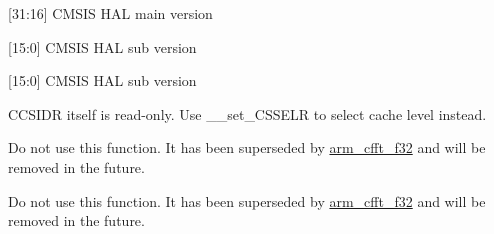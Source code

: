 \begin{DoxyRefList}
\label{deprecated__deprecated000086}%
%
\mbox{[}31\+:16\mbox{]} CMSIS HAL main version  
\item[Global \mbox{\hyperlink{_include_2core__sc300_8h_a664c9e59952455ddeee28173b864fe9d}{\+\_\+\+\_\+\+SC300\+\_\+\+CMSIS\+\_\+\+VERSION\+\_\+\+SUB}} ]\label{deprecated__deprecated000087}%
%
\mbox{[}15\+:0\mbox{]} CMSIS HAL sub version 

\label{deprecated__deprecated000035}%
%
\mbox{[}15\+:0\mbox{]} CMSIS HAL sub version  
\item[Global \mbox{\hyperlink{cmsis__cp15_8h_a639d467f42fdad7a173f90568b697fc8}{\+\_\+\+\_\+set\+\_\+\+CCSIDR}} (uint32\+\_\+t value)]\label{deprecated__deprecated000037}%
%
CCSIDR itself is read-\/only. Use \+\_\+\+\_\+set\+\_\+\+CSSELR to select cache level instead.  
\item[Global \mbox{\hyperlink{group___complex_f_f_t_ga9fadd650b802f612ae558ddaab789a6d}{arm\+\_\+cfft\+\_\+radix2\+\_\+f32}} (const \mbox{\hyperlink{structarm__cfft__radix2__instance__f32}{arm\+\_\+cfft\+\_\+radix2\+\_\+instance\+\_\+f32}} $\ast$S, float32\+\_\+t $\ast$p\+Src)]\label{deprecated__deprecated000039}%
%
Do not use this function. It has been superseded by \mbox{\hyperlink{group___complex_f_f_t_gade0f9c4ff157b6b9c72a1eafd86ebf80}{arm\+\_\+cfft\+\_\+f32}} and will be removed in the future.  
\item[Global \mbox{\hyperlink{group___complex_f_f_t_gac9565e6bc7229577ecf5e090313cafd7}{arm\+\_\+cfft\+\_\+radix2\+\_\+init\+\_\+f32}} (\mbox{\hyperlink{structarm__cfft__radix2__instance__f32}{arm\+\_\+cfft\+\_\+radix2\+\_\+instance\+\_\+f32}} $\ast$S, uint16\+\_\+t fft\+Len, uint8\+\_\+t ifft\+Flag, uint8\+\_\+t bit\+Reverse\+Flag)]\label{deprecated__deprecated000040}%
%
Do not use this function. It has been superseded by \mbox{\hyperlink{group___complex_f_f_t_gade0f9c4ff157b6b9c72a1eafd86ebf80}{arm\+\_\+cfft\+\_\+f32}} and will be removed in the future.  
\item[Global \mbox{\hyperlink{group___complex_f_f_t_ga5c5b2127b3c4ea2d03692127f8543858}{arm\+\_\+cfft\+\_\+radix2\+\_\+init\+\_\+q15}} (\mbox{\hyperlink{structarm__cfft__radix2__instance__q15}{arm\+\_\+cfft\+\_\+radix2\+\_\+instance\+\_\+q15}} $\ast$S, uint16\+\_\+t fft\+Len, uint8\+\_\+t ifft\+Flag, uint8\+\_\+t bit\+Reverse\+Flag)]\label{deprecated__deprecated000041}%

\end{DoxyRefList}
